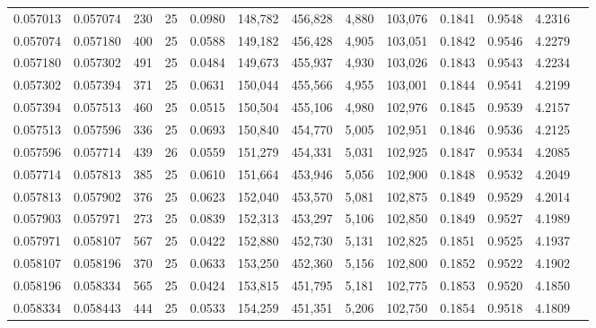 \begin{tabular}{rrrrrrrrrrrrr}
0.057013 & 0.057074 &   230 &  25 &                                     0.0980 & 148,782 & 456,828 &   4,880 & 103,076 & 0.1841 & 0.9548 & 4.2316 \\
0.057074 & 0.057180 &   400 &  25 &                                     0.0588 & 149,182 & 456,428 &   4,905 & 103,051 & 0.1842 & 0.9546 & 4.2279 \\
0.057180 & 0.057302 &   491 &  25 &                                     0.0484 & 149,673 & 455,937 &   4,930 & 103,026 & 0.1843 & 0.9543 & 4.2234 \\
0.057302 & 0.057394 &   371 &  25 &                                     0.0631 & 150,044 & 455,566 &   4,955 & 103,001 & 0.1844 & 0.9541 & 4.2199 \\
0.057394 & 0.057513 &   460 &  25 &                                     0.0515 & 150,504 & 455,106 &   4,980 & 102,976 & 0.1845 & 0.9539 & 4.2157 \\
0.057513 & 0.057596 &   336 &  25 &                                     0.0693 & 150,840 & 454,770 &   5,005 & 102,951 & 0.1846 & 0.9536 & 4.2125 \\
0.057596 & 0.057714 &   439 &  26 &                                     0.0559 & 151,279 & 454,331 &   5,031 & 102,925 & 0.1847 & 0.9534 & 4.2085 \\
0.057714 & 0.057813 &   385 &  25 &                                     0.0610 & 151,664 & 453,946 &   5,056 & 102,900 & 0.1848 & 0.9532 & 4.2049 \\
0.057813 & 0.057902 &   376 &  25 &                                     0.0623 & 152,040 & 453,570 &   5,081 & 102,875 & 0.1849 & 0.9529 & 4.2014 \\
0.057903 & 0.057971 &   273 &  25 &                                     0.0839 & 152,313 & 453,297 &   5,106 & 102,850 & 0.1849 & 0.9527 & 4.1989 \\
0.057971 & 0.058107 &   567 &  25 &                                     0.0422 & 152,880 & 452,730 &   5,131 & 102,825 & 0.1851 & 0.9525 & 4.1937 \\
0.058107 & 0.058196 &   370 &  25 &                                     0.0633 & 153,250 & 452,360 &   5,156 & 102,800 & 0.1852 & 0.9522 & 4.1902 \\
0.058196 & 0.058334 &   565 &  25 &                                     0.0424 & 153,815 & 451,795 &   5,181 & 102,775 & 0.1853 & 0.9520 & 4.1850 \\
0.058334 & 0.058443 &   444 &  25 &                                     0.0533 & 154,259 & 451,351 &   5,206 & 102,750 & 0.1854 & 0.9518 & 4.1809 \\

\end{tabular}
